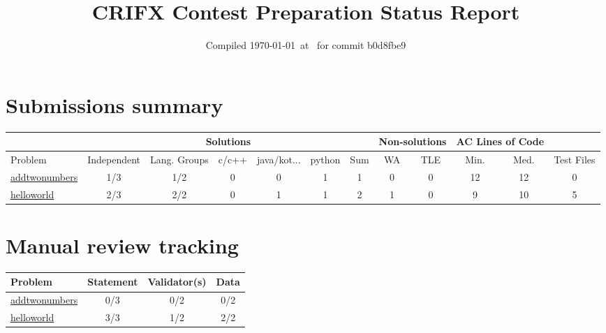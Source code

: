 \documentclass{article}%
\title{CRIFX Contest Preparation Status Report}%
\author{}%
\date{Compiled \today~at \DTMcurrenttime\DTMcurrentzone~for commit b0d8fbe9}%
\begin{document}
%
\normalsize%
\maketitle%
\section*{Submissions summary}%
\label{sec:Submissionssummary}%
\begin{tabular}{|l|c|c|c|c|c|c|c|c|c|c|c|}%
\hline%
\rowcolor{cyan}%
&\multicolumn{6}{c|}{{\tiny Solutions}}&\multicolumn{2}{c|}{{\tiny Non-solutions}}&\multicolumn{2}{c|}{{\tiny AC Lines of Code}}&\\%
\hline%
\rowcolor{cyan}%
{\tiny Problem}&{\tiny Independent}&{\tiny Lang. Groups}&{\tiny c/c++}&{\tiny java/kot...}&{\tiny python}&{\tiny Sum}&{\tiny WA}&{\tiny TLE}&{\tiny Min.}&{\tiny Med.}&{\tiny Test Files}\\%
\hline%
\hyperref[sec:addtwonumbers]{addtwonumbers}&\cellcolor{insufficientred}1/3&\cellcolor{insufficientred}1/2&0&0&1&1&0&0&12&12&0\\%
\hline%
\hyperref[sec:helloworld]{helloworld}&\cellcolor{insufficientred}2/3&\cellcolor{sufficientgreen}2/2&0&1&1&2&1&0&9&10&5\\%
\hline%
\end{tabular}

%
\section*{Manual review tracking}%
\label{sec:Manualreviewtracking}%
\begin{tabular}{|l|c|c|c|}%
\hline%
\rowcolor{cyan}%
{\tiny Problem}&{\tiny Statement}&{\tiny Validator(s)}&{\tiny Data}\\%
\hline%
\hyperref[sec:addtwonumbers]{addtwonumbers}&\cellcolor{insufficientred}0/3&\cellcolor{insufficientred}0/2&\cellcolor{insufficientred}0/2\\%
\hline%
\hyperref[sec:helloworld]{helloworld}&\cellcolor{sufficientgreen}3/3&\cellcolor{insufficientred}1/2&\cellcolor{sufficientgreen}2/2\\%
\hline%
\end{tabular}

%
\end{document}
